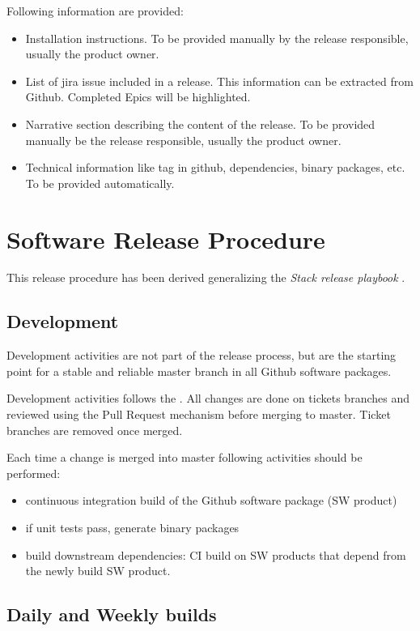 Following information are provided:
\begin{itemize}
\item Installation instructions. To be provided manually by the release responsible, usually the product owner.
\item List of jira issue included in a release. This information can be extracted from Github. Completed Epics  will be highlighted. 
\item Narrative section describing the content of the release. To be provided manually be the release responsible, usually the product owner.
\item Technical information like tag in github, dependencies, binary packages, etc. To be provided automatically.
\end{itemize}


\newpage
\section{Software Release Procedure} \label{sect:releaseprocedure}

This release procedure has been derived generalizing the \textit{Stack release playbook} .

\subsection{Development} \label{sect:dev}

Development activities are not part of the release process, but are the starting point for a stable and reliable master branch in all Github software packages.

Development activities follows the \citep{DevGuide}. All changes are done on tickets branches and reviewed using the Pull Request mechanism before merging to master.
Ticket branches are removed once merged.

Each time a change is merged into master following activities should be performed:

\begin{itemize}
\item continuous integration build of the Github software package (SW product)
\item if unit tests pass, generate binary packages
\item build downstream dependencies: CI build on SW products that depend from the newly build SW product.
\end{itemize}

\subsection{Daily and Weekly builds} \label{sect:weekly}

